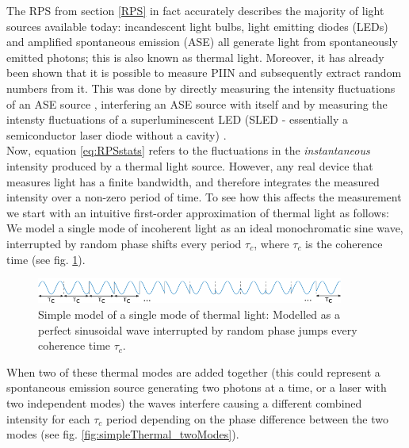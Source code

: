 \documentclass[]{article}
\begin{document}
	The RPS from section \ref{RPS} in fact accurately describes the majority of light sources available today: incandescent light bulbs, light emitting diodes (LEDs) and amplified spontaneous emission (ASE) all generate light from spontaneously emitted photons; this is also known as thermal light. Moreover, it has already been shown that it is possible to measure PIIN and subsequently extract random numbers from it. This was done by directly measuring the intensity fluctuations of an ASE source \cite{argyris_sub-tb/s_2012}, interfering an ASE source with itself \cite{li_random_2014} and by measuring the intensty fluctuations of a superluminescent LED (SLED - essentially a semiconductor laser diode without a cavity) \cite{huang_real-time_2014, li_scalable_2011}.\\
	Now, equation \ref{eq:RPSstats} refers to the fluctuations in the \textit{instantaneous} intensity produced by a thermal light source. However, any real device that measures light has a finite bandwidth, and therefore integrates the measured intensity over a non-zero period of time. To see how this affects the measurement we start with an intuitive first-order approximation of thermal light as follows: We model a single mode of incoherent light as an ideal monochromatic sine wave, interrupted by random phase shifts every period $\tau_c$, where $\tau_c$ is the coherence time (see fig. \ref{fig:simpleThermal_oneMode}).
		\begin{figure}[h]
		\centering
		\includegraphics[width=0.9\textwidth]{simpleThermal_oneMode.png}
		\caption{\label{fig:simpleThermal_oneMode} Simple model of a single mode of thermal light: Modelled as a perfect sinusoidal wave interrupted by random phase jumps every coherence time $\tau_c$.}
		\end{figure}
	When two of these thermal modes are added together (this could represent a spontaneous emission source generating two photons at a time, or a laser with two independent modes) the waves interfere causing a different combined intensity for each $\tau_c$ period depending on the phase difference between the two modes (see fig. \ref{fig:simpleThermal_twoModes}).\\
\end{document}
